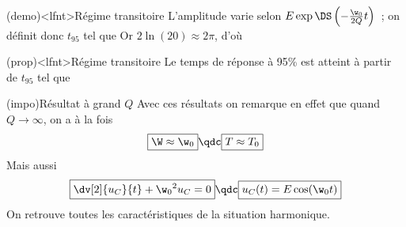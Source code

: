 \documentclass[../../main/main.tex]{subfiles}
\begin{document}
\begin{tcb}[label=demo:transipseudo](demo)<lfnt>{Régime transitoire}
	L'amplitude varie selon $E\exp \DS \left( -\frac{\w_0}{2Q}t \right)$~; on
	définit donc $t_{95}$ tel que
	Or $2\ln(20) \approx 2\pi$, d'où
\end{tcb}
\begin{tcb}[label=prop:transipseudo](prop)<lfnt>{Régime transitoire}
	Le temps de réponse à 95\% est atteint à partir de $t_{95}$ tel que
	\vspace{-15pt}
\end{tcb}
\begin{tcb}[label=impo:pseudograndQ](impo){Résultat à grand $Q$}
	Avec ces résultats on remarque en effet que quand $Q \rightarrow \infty$, on
	a à la fois
	\begin{equation*}
		\boxed{\W \approx \w_0} \qdc \boxed{T \approx T_0}
	\end{equation*}
	Mais aussi
	\begin{equation*}
		\boxed{\dv[2]{u_C}{t} + \w_0{}^2u_C = 0} \qdc \boxed{u_C(t) = E\cos(\w_0t)}
	\end{equation*}
	On retrouve toutes les caractéristiques de la situation harmonique.
\end{tcb}
\end{document}
